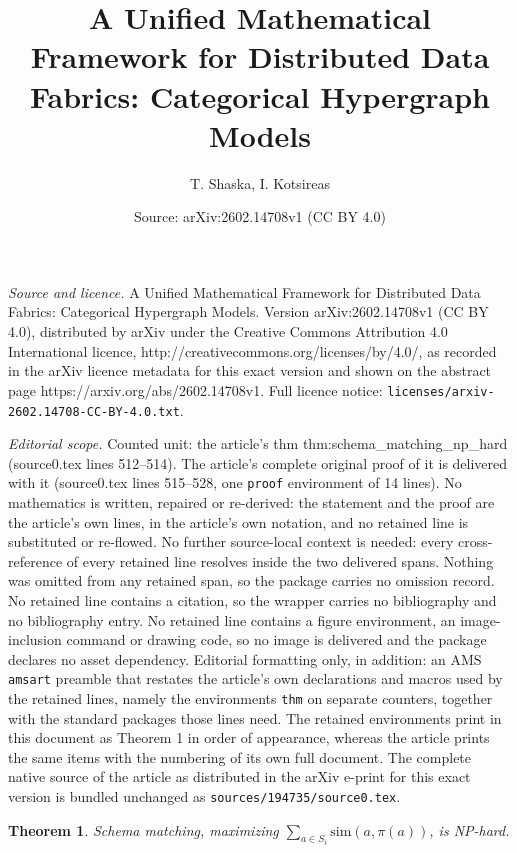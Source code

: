 \documentclass[10pt,a4paper]{amsart}
\title{A Unified Mathematical Framework for Distributed Data Fabrics: Categorical Hypergraph Models}
\author{T. Shaska, I. Kotsireas}
\date{Source: arXiv:2602.14708v1 (CC BY 4.0)}
\newtheorem{thm}{Theorem}
\begin{document}
\maketitle

\noindent\emph{Source and licence.} A Unified Mathematical Framework for Distributed Data Fabrics: Categorical Hypergraph Models. Version arXiv:2602.14708v1 (CC BY 4.0), distributed by arXiv under the Creative Commons Attribution 4.0 International licence, http://creativecommons.org/licenses/by/4.0/, as recorded in the arXiv licence metadata for this exact version and shown on the abstract page https://arxiv.org/abs/2602.14708v1. Full licence notice: \texttt{licenses/arxiv-2602.14708-CC-BY-4.0.txt}.\par\smallskip

\noindent\textit{Editorial scope.} Counted unit: the article's thm thm:schema\_matching\_np\_hard (source0.tex lines 512--514). The article's complete original proof of it is delivered with it (source0.tex lines 515--528, one \texttt{proof} environment of 14 lines). No mathematics is written, repaired or re-derived: the statement and the proof are the article's own lines, in the article's own notation, and no retained line is substituted or re-flowed.  No further source-local context is needed: every cross-reference of every retained line resolves inside the two delivered spans.  Nothing was omitted from any retained span, so the package carries no omission record.  No retained line contains a citation, so the wrapper carries no bibliography and no bibliography entry.  No retained line contains a figure environment, an image-inclusion command or drawing code, so no image is delivered and the package declares no asset dependency.  Editorial formatting only, in addition: an AMS \texttt{amsart} preamble that restates the article's own declarations and macros used by the retained lines, namely the environments \texttt{thm} on separate counters, together with the standard packages those lines need.  The retained environments print in this document as Theorem 1 in order of appearance, whereas the article prints the same items with the numbering of its own full document.  The complete native source of the article as distributed in the arXiv e-print for this exact version is bundled unchanged as \texttt{sources/194735/source0.tex}.
\begin{thm} \label{thm:schema_matching_np_hard}
Schema matching, maximizing \( \sum_{a \in S_i} \text{sim}(a, \pi(a)) \), is NP-hard.
\end{thm}
\end{document}

